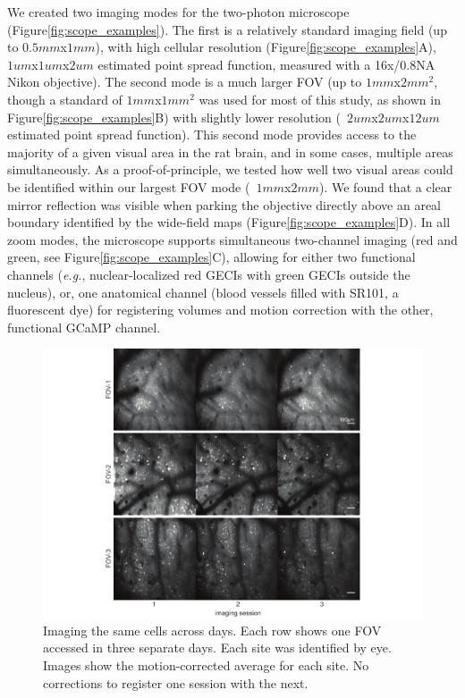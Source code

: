 We created two imaging modes for the two-photon microscope (Figure\ref{fig:scope_examples}). The first is a relatively standard imaging field (up to $0.5mm$x$1mm$), with high cellular resolution (Figure\ref{fig:scope_examples}A), ~$1um$x$1um$x$2um$ estimated point spread function, measured with a 16x/0.8NA Nikon objective). The second mode is a much larger FOV (up to $1mm$x$2mm^2$, though a standard of $1mm$x$1mm^2$ was used for most of this study, as shown in Figure\ref{fig:scope_examples}B) with slightly lower resolution (~$2um$x$2um$x$12um$ estimated point spread function). This second mode provides access to the majority of a given visual area in the rat brain, and in some cases, multiple areas simultaneously. As a proof-of-principle, we tested how well two visual areas could be identified within our largest FOV mode (~$1mm$x$2mm$). We found that a clear mirror reflection was visible when parking the objective directly above an areal boundary identified by the wide-field maps (Figure\ref{fig:scope_examples}D). In all zoom modes, the microscope supports simultaneous two-channel imaging (red and green, see Figure\ref{fig:scope_examples}C), allowing for either two functional channels (\textit{e.g.}, nuclear-localized red GECIs with green GECIs outside the nucleus), or, one anatomical channel (blood vessels filled with SR101, a fluorescent dye) for registering volumes and motion correction with the other, functional GCaMP channel. 

\begin{figure}[t!]
    \includegraphics[width=\textwidth]{figures/chapter_2/fig_2-8_multiday_imaging/fig_2-8_multiday_imaging.pdf}
    \vspace{.1in}
    \caption[Multi-day imaging]{Imaging the same cells across days. Each row shows one FOV accessed in three separate days. Each site was identified by eye. Images show the motion-corrected average for each site. No corrections to register one session with the next.    
    \label{fig:multiday_imaging}}
\end{figure}

